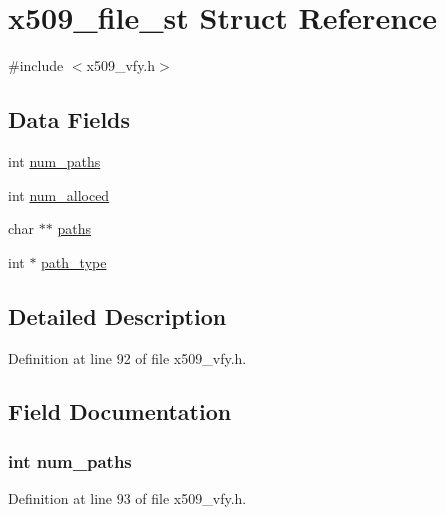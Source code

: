 \hypertarget{structx509__file__st}{}\section{x509\+\_\+file\+\_\+st Struct Reference}
\label{structx509__file__st}


{\ttfamily \#include $<$x509\+\_\+vfy.\+h$>$}

\subsection*{Data Fields}
\begin{DoxyCompactItemize}
\item 
int \hyperlink{structx509__file__st_a82598f94648de06ab614bfc82fb8c14e}{num\+\_\+paths}
\item 
int \hyperlink{structx509__file__st_af85b54cafa6bd09c1263cb1c97d62f66}{num\+\_\+alloced}
\item 
char $\ast$$\ast$ \hyperlink{structx509__file__st_ae2882836845d3815a9b4c33d399c6199}{paths}
\item 
int $\ast$ \hyperlink{structx509__file__st_a0d65f550882b47978bdf8f92601ce9ae}{path\+\_\+type}
\end{DoxyCompactItemize}


\subsection{Detailed Description}


Definition at line 92 of file x509\+\_\+vfy.\+h.



\subsection{Field Documentation}
\subsubsection[{\texorpdfstring{num\+\_\+paths}{num_paths}}]{\setlength{\rightskip}{0pt plus 5cm}int num\+\_\+paths}\hypertarget{structx509__file__st_a82598f94648de06ab614bfc82fb8c14e}{}\label{structx509__file__st_a82598f94648de06ab614bfc82fb8c14e}


Definition at line 93 of file x509\+\_\+vfy.\+h.

